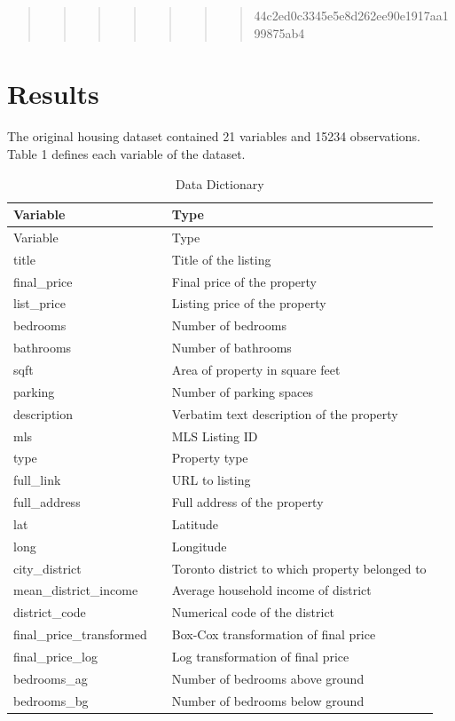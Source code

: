 \documentclass[11pt,]{article}
\begin{document}
\begin{quote}
\begin{quote}
\begin{quote}
\begin{quote}
\begin{quote}
\begin{quote}
\begin{quote}
44c2ed0c3345e5e8d262ee90e1917aa199875ab4
\end{quote}
\end{quote}
\end{quote}
\end{quote}
\end{quote}
\end{quote}
\end{quote}

\hypertarget{results}{%
\section{Results}\label{results}}

The original housing dataset contained 21 variables and 15234
observations. Table 1 defines each variable of the dataset.

\begin{longtable}[]{@{}lll@{}}
\caption{Data Dictionary}\tabularnewline
\toprule
Variable & & Type\tabularnewline
\midrule
\endfirsthead
\toprule
Variable & & Type\tabularnewline
\midrule
\endhead
title & & Title of the listing\tabularnewline
final\_price & & Final price of the property\tabularnewline
list\_price & & Listing price of the property\tabularnewline
bedrooms & & Number of bedrooms\tabularnewline
bathrooms & & Number of bathrooms\tabularnewline
sqft & & Area of property in square feet\tabularnewline
parking & & Number of parking spaces\tabularnewline
description & & Verbatim text description of the property\tabularnewline
mls & & MLS Listing ID\tabularnewline
type & & Property type\tabularnewline
full\_link & & URL to listing\tabularnewline
full\_address & & Full address of the property\tabularnewline
lat & & Latitude\tabularnewline
long & & Longitude\tabularnewline
city\_district & & Toronto district to which property belonged
to\tabularnewline
mean\_district\_income & & Average household income of
district\tabularnewline
district\_code & & Numerical code of the district\tabularnewline
final\_price\_transformed & & Box-Cox transformation of final
price\tabularnewline
final\_price\_log & & Log transformation of final price\tabularnewline
bedrooms\_ag & & Number of bedrooms above ground\tabularnewline
bedrooms\_bg & & Number of bedrooms below ground\tabularnewline
\bottomrule
\end{longtable}
\end{document}
